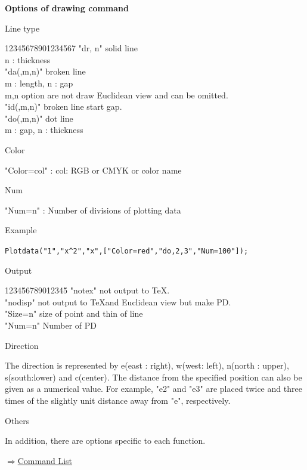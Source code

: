 \documentclass[papersize,a4paper,12pt]{article}
\newenvironment{cmd}[2]{
\hypertarget{#2}{}
\begin{center}{\bf\large #1}\end{center}
\begin{description}
}{
\end{description}
\begin{flushright} \hyperlink{functionlist}{$\Rightarrow$Command List}\end{flushright}
}
\begin{document}
\begin{cmd}{Options of drawing command}{options}

\item Line type

\begin{tabbing}
1234\=5678901234567\=\kill
  \>    "dr, n"     \>solid line\\
  \>                    \> n : thickness\\
  \>    "da(,m,n)"  \>broken line \\
  \>                \> m : length, n : gap \\
  \>                 \>m,n option are not draw Euclidean view and can be omitted.\\
  \>    "id(,m,n)"   \>broken line start gap.\\
  \>    "do(,m,n)"  \>dot line\\
  \>                \>m : gap, n : thickness
\end{tabbing}

\item Color 

\hspace{10mm}"Color=col" : col: RGB or CMYK or color name

\item Num

\hspace{10mm}"Num=n" : Number of divisions of plotting data

\vspace{\baselineskip}
\hspace{5mm} Example

\hspace{10mm} \verb|Plotdata("1","x^2","x",["Color=red","do,2,3","Num=100"]);|

\item Output
\begin{tabbing}
  1234\=56789012345\=\kill
 \>    "notex"  \>not output to \TeX.\\
 \>    "nodisp" \>not output to \TeX and Euclidean view but make PD.\\
 \>    "Size=n"  \> size of point and thin of line\\
 \>    "Num=n"  \>Number of PD
\end{tabbing}

\item Direction

The direction is represented by e(east : right), w(west: left), n(north : upper), s(south:lower) and c(center). The distance from the specified position can also be given as a numerical value.  For example, "e2" and "e3" are placed twice and three times of the slightly unit distance away from "e", respectively. 

\begin{center}  \end{center}

\item Others

In addition, there are options specific to each function.

\end{cmd}
\end{document}
